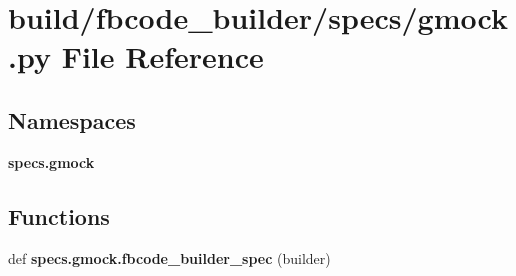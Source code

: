 \section{build/fbcode\+\_\+builder/specs/gmock.py File Reference}
\label{gmock_8py}
\subsection*{Namespaces}
\begin{DoxyCompactItemize}
\item 
 {\bf specs.\+gmock}
\end{DoxyCompactItemize}
\subsection*{Functions}
\begin{DoxyCompactItemize}
\item 
def {\bf specs.\+gmock.\+fbcode\+\_\+builder\+\_\+spec} (builder)
\end{DoxyCompactItemize}
